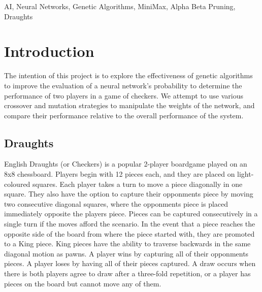 \documentclass[12pt,a4paper]{article}
\begin{document}
\begin{keywords}
AI, Neural Networks, Genetic Algorithms, MiniMax, Alpha Beta Pruning, Draughts

\end{keywords}





\section{Introduction}
The intention of this project is to explore the effectiveness of genetic algorithms to improve the evaluation of a neural network's probability to determine the performance of two players in a game of checkers. We attempt to use various crossover and mutation strategies to manipulate the weights of the network, and compare their performance relative to the overall performance of the system.

\subsection*{Draughts}

English Draughts (or Checkers) is a popular 2-player boardgame played on an 8x8 chessboard. Players begin with 12 pieces each, and they are placed on light-coloured squares. Each player takes a turn to move a piece diagonally in one square. They also have the option to capture their opponments piece by moving two consecutive diagonal squares, where the opponments piece is placed immediately opposite the players piece. Pieces can be captured consecutively in a single turn if the moves afford the scenario. In the event that a piece reaches the opposite side of the board from where the piece started with, they are promoted to a King piece. King pieces have the ability to traverse backwards in the same diagonal motion as pawns. A player wins by capturing all of their opponments pieces. A player loses by having all of their pieces captured. A draw occurs when there is both players agree to draw after a  three-fold repetition, or a player has pieces on the board but cannot move any of them.
\end{document}

